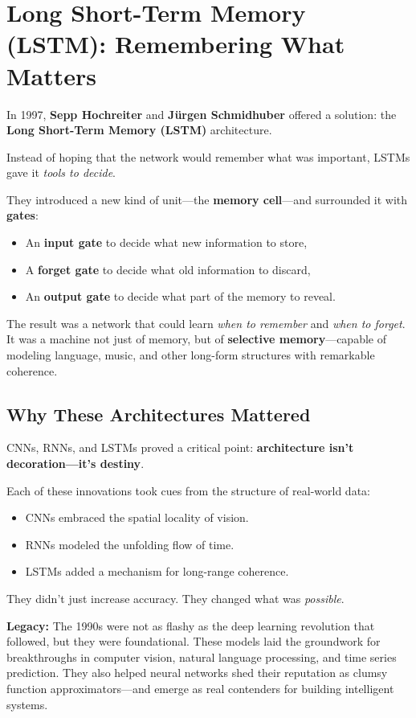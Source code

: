 \section{Long Short-Term Memory (LSTM): Remembering What Matters}

In 1997, \textbf{Sepp Hochreiter} and \textbf{Jürgen Schmidhuber} offered a solution: the \textbf{Long Short-Term Memory (LSTM)} architecture.

Instead of hoping that the network would remember what was important, LSTMs gave it \emph{tools to decide}.

They introduced a new kind of unit—the \textbf{memory cell}—and surrounded it with \textbf{gates}:
\begin{itemize}
  \item An \textbf{input gate} to decide what new information to store,
  \item A \textbf{forget gate} to decide what old information to discard,
  \item An \textbf{output gate} to decide what part of the memory to reveal.
\end{itemize}

The result was a network that could learn \emph{when to remember} and \emph{when to forget}. It was a machine not just of memory, but of \textbf{selective memory}—capable of modeling language, music, and other long-form structures with remarkable coherence.

\subsection{Why These Architectures Mattered}

CNNs, RNNs, and LSTMs proved a critical point: \textbf{architecture isn’t decoration—it’s destiny}.

Each of these innovations took cues from the structure of real-world data:
\begin{itemize}
  \item CNNs embraced the spatial locality of vision.
  \item RNNs modeled the unfolding flow of time.
  \item LSTMs added a mechanism for long-range coherence.
\end{itemize}

They didn’t just increase accuracy. They changed what was \emph{possible}.

\medskip

\noindent\textbf{Legacy:} The 1990s were not as flashy as the deep learning revolution that followed, but they were foundational. These models laid the groundwork for breakthroughs in computer vision, natural language processing, and time series prediction. They also helped neural networks shed their reputation as clumsy function approximators—and emerge as real contenders for building intelligent systems.

